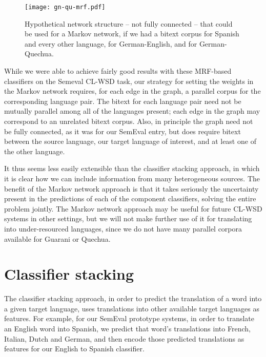 \begin{figure}
  \begin{center}
  \texttt{[image: gn-qu-mrf.pdf]}
  \end{center}
  \caption{Hypothetical network structure -- not fully connected -- that could
  be used for a Markov network, if we had a bitext corpus for Spanish and every
  other language, for German-English, and for German-Quechua.}
  \label{fig:pentagram}
\end{figure}

While we were able to achieve fairly good results with these MRF-based
classifiers on the Semeval CL-WSD task, our strategy for setting the weights in
the Markov network requires, for each edge in the graph, a parallel corpus for
the corresponding language pair. The bitext for each language pair need not be
mutually parallel among all of the languages present; each edge in the graph
may correspond to an unrelated bitext corpus.  Also, in principle the graph
need not be fully connected, as it was for our SemEval entry, but does require
bitext between the source language, our target language of interest, and at
least one of the other language.

It thus seems less easily extensible than the classifier stacking approach, in
which it is clear how we can include information from many heterogeneous
sources. The benefit of the Markov network approach is that it takes seriously
the uncertainty present in the predictions of each of the component
classifiers, solving the entire problem jointly. The Markov network approach
may be useful for future CL-WSD systems in other settings, but we will not make
further use of it for translating into under-resourced languages, since we do
not have many parallel corpora available for Guarani or Quechua.

\section{Classifier stacking}
The classifier stacking approach, in order to predict the translation of a word
into a given target language, uses translations into other available target
languages as features.
For example, for our SemEval prototype systems, in order to translate an
English word into Spanish, we predict that word's translations into French,
Italian, Dutch and German, and then encode those predicted translations as
features for our English to Spanish classifier.


